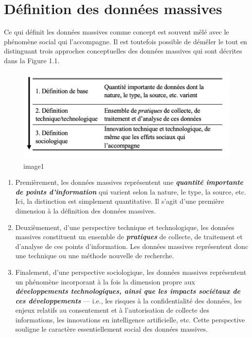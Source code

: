\documentclass[
  letterpaper,
]{scrbook}
\begin{document}
\hypertarget{duxe9finition-des-donnuxe9es-massives}{%
\section{Définition des données
massives}\label{duxe9finition-des-donnuxe9es-massives}}

Ce qui définit les données massives comme concept est souvent mêlé avec
le phénomène social qui l'accompagne. Il est toutefois possible de
démêler le tout en distinguant trois approches conceptuelles des données
massives qui sont décrites dans la Figure 1.1.

\begin{figure}

{\centering \includegraphics{images/chapitre1_1.png}

}

\caption{image1}

\end{figure}

\begin{enumerate}
\def\labelenumi{\arabic{enumi}.}
\item
  Premièrement, les données massives représentent une
  \textbf{\emph{quantité importante de points d'information}} qui
  varient selon la nature, le type, la source, etc. Ici, la distinction
  est simplement quantitative. Il s'agit d'une première dimension à la
  définition des données massives.
\item
  Deuxièmement, d'une perspective technique et technologique, les
  données massives constituent un ensemble de \textbf{\emph{pratiques}}
  de collecte, de traitement et d'analyse de ces points d'information.
  Les données massives représentent donc une technique ou une méthode
  nouvelle de recherche.
\item
  Finalement, d'une perspective sociologique, les données massives
  représentent un phénomène incorporant à la fois la dimension propre
  aux \textbf{\emph{développements technologiques, ainsi que les impacts
  sociétaux de ces développements}} --- i.e., les risques à la
  confidentialité des données, les enjeux relatifs au consentement et à
  l'autorisation de collecte des informations, les innovations en
  intelligence artificielle, etc. Cette perspective souligne le
  caractère essentiellement social des données massives.
\end{enumerate}
\end{document}
